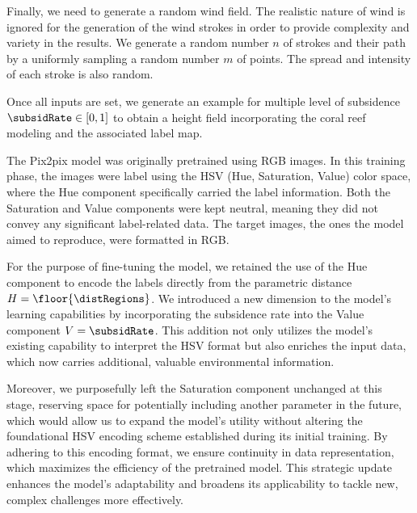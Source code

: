 \documentclass{egpubl}
\begin{document}


Finally, we need to generate a random wind field. The realistic nature of wind is ignored for the generation of the wind strokes in order to provide complexity and variety in the results. 
We generate a random number $n$ of strokes and their path by a uniformly sampling a random number $m$ of points. The spread and intensity of each stroke is also random.

Once all inputs are set, we generate an example for multiple level of subsidence $\subsidRate \in [0, 1]$ to obtain a height field incorporating the coral reef modeling and the associated label map. 

The Pix2pix model was originally pretrained using RGB images. In this training phase, the images were label using the HSV (Hue, Saturation, Value) color space, where the Hue component specifically carried the label information. Both the Saturation and Value components were kept neutral, meaning they did not convey any significant label-related data. The target images, the ones the model aimed to reproduce, were formatted in RGB.

For the purpose of fine-tuning the model, we retained the use of the Hue component to encode the labels  directly from the parametric distance $H = \floor{\distRegions}$. We introduced a new dimension to the model's learning capabilities by incorporating the subsidence rate into the Value component $V =\subsidRate$. This addition not only utilizes the model's existing capability to interpret the HSV format but also enriches the input data, which now carries additional, valuable environmental information.

Moreover, we purposefully left the Saturation component unchanged at this stage, reserving space for potentially including another parameter in the future, which would allow us to expand the model's utility without altering the foundational HSV encoding scheme established during its initial training. By adhering to this encoding format, we ensure continuity in data representation, which maximizes the efficiency of the pretrained model. This strategic update enhances the model's adaptability and broadens its applicability to tackle new, complex challenges more effectively.
\end{document}
